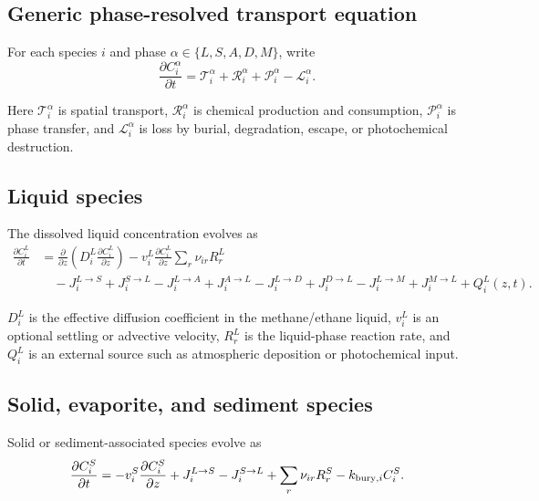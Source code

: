 \documentclass[11pt]{article}
\begin{document}
\subsection{Generic phase-resolved transport equation}

For each species $i$ and phase $\alpha\in\{L,S,A,D,M\}$, write
\begin{equation}
\frac{\partial C_i^\alpha}{\partial t}
=
\mathcal{T}_i^\alpha
+
\mathcal{R}_i^\alpha
+
\mathcal{P}_i^\alpha
-
\mathcal{L}_i^\alpha.
\end{equation}

Here $\mathcal{T}_i^\alpha$ is spatial transport, $\mathcal{R}_i^\alpha$ is chemical production and consumption, $\mathcal{P}_i^\alpha$ is phase transfer, and $\mathcal{L}_i^\alpha$ is loss by burial, degradation, escape, or photochemical destruction.

\subsection{Liquid species}

The dissolved liquid concentration evolves as
\begin{align}
\frac{\partial C_i^L}{\partial t}
&=
\frac{\partial}{\partial z}
\left(
D_i^L \frac{\partial C_i^L}{\partial z}
\right)
-v_i^L\frac{\partial C_i^L}{\partial z}
\sum_r \nu_{ir}R_r^L
\nonumber\\
&\quad
-J_i^{L\rightarrow S}
+J_i^{S\rightarrow L}
-J_i^{L\rightarrow A}
+J_i^{A\rightarrow L}
-J_i^{L\rightarrow D}
+J_i^{D\rightarrow L}
-J_i^{L\rightarrow M}
+J_i^{M\rightarrow L}
+Q_i^L(z,t).
\end{align}

$D_i^L$ is the effective diffusion coefficient in the methane/ethane liquid, $v_i^L$ is an optional settling or advective velocity, $R_r^L$ is the liquid-phase reaction rate, and $Q_i^L$ is an external source such as atmospheric deposition or photochemical input.

\subsection{Solid, evaporite, and sediment species}

Solid or sediment-associated species evolve as
\begin{equation}
\frac{\partial C_i^S}{\partial t}
=
-v_i^S\frac{\partial C_i^S}{\partial z}
+J_i^{L\rightarrow S}
-J_i^{S\rightarrow L}
+\sum_r \nu_{ir}R_r^S
-k_{{\rm bury},i}C_i^S.
\end{equation}
\end{document}
